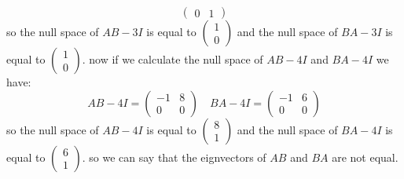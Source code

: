 \begin{qsolve}
\begin{qsolve}[]
$$\begin{pmatrix}
				0 & 1
			\end{pmatrix}$$
			so the null space of $AB - 3I$ is equal to $\begin{pmatrix}
				1 \\
				0
			\end{pmatrix}$ and the null space of $BA - 3I$ is equal to $\begin{pmatrix}
				1 \\
				0
				\end{pmatrix}$. now if we calculate the null space of $AB - 4I$ and $BA - 4I$ we have:
				$$AB - 4I = \begin{pmatrix}
					-1 & 8 \\
					0 & 0
				\end{pmatrix} \quad BA - 4I = \begin{pmatrix}
					-1 & 6 \\
					0 & 0
				\end{pmatrix}$$
				so the null space of $AB - 4I$ is equal to $\begin{pmatrix}
					8 \\
					1
				\end{pmatrix}$ and the null space of $BA - 4I$ is equal to $\begin{pmatrix}
					6 \\
					1
				\end{pmatrix}$. so we can say that the eignvectors of $AB$ and $BA$ are not equal.
	\end{qsolve}
\end{qsolve}
